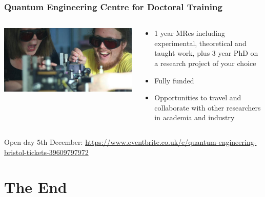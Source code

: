 \documentclass[]{beamer}
\begin{document}
\begin{frame}
\frametitle{Quantum Engineering Centre for Doctoral Training}

  \begin{columns}[T]
    \begin{column}{.5\textwidth}
    \begin{center}
    \includegraphics[scale=0.2]{cdt_open_day}
    \end{center}
    \end{column}
    \begin{column}{.5\textwidth}
    \begin{itemize}
    \item 1 year MRes including experimental, theoretical and taught work, plus 3 year PhD on a research project of your choice
    
    \item Fully funded
    
    \item Opportunities to travel and collaborate with other researchers in academia and industry
    \end{itemize}
    \end{column}
  \end{columns}
  
  Open day 5th December: \url{https://www.eventbrite.co.uk/e/quantum-engineering-bristol-tickets-39609797972}

\end{frame}

\section{The End}
\end{document}

